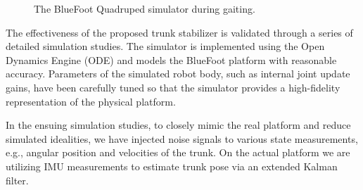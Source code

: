 	\begin{figure}[b!]\centering
		\vspace{-5mm}
		\caption{ The BlueFoot Quadruped simulator during gaiting. }
		\label{fig::bluefoot}
	\end{figure}

The effectiveness of the proposed trunk stabilizer is validated through a series of detailed simulation studies. The simulator is implemented using the Open Dynamics Engine (ODE) \cite{OpenDynamicsEngine} and models the BlueFoot platform with reasonable accuracy. Parameters of the simulated robot body, such as internal joint update gains, have been carefully tuned so that the simulator provides a high-fidelity representation of the physical platform.


In the ensuing simulation studies, to closely mimic  the real platform and reduce simulated idealities, we have injected noise signals to various state measurements, e.g., angular position and velocities of the trunk. On the actual platform we are utilizing IMU measurements to estimate trunk pose via an extended Kalman filter.


